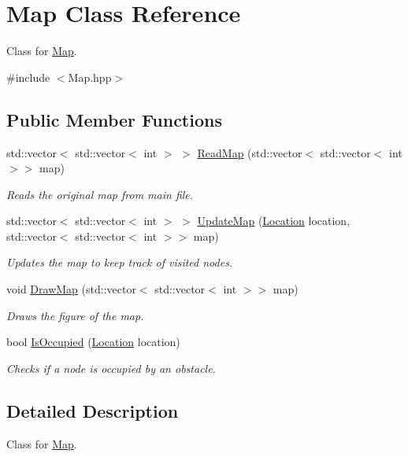 \hypertarget{classMap}{}\section{Map Class Reference}
\label{classMap}


Class for \hyperlink{classMap}{Map}.  




{\ttfamily \#include $<$Map.\+hpp$>$}

\subsection*{Public Member Functions}
\begin{DoxyCompactItemize}
\item 
std\+::vector$<$ std\+::vector$<$ int $>$ $>$ \hyperlink{classMap_a3e039af82e749384fc9f4c86e5d45a71}{Read\+Map} (std\+::vector$<$ std\+::vector$<$ int $>$$>$ map)
\begin{DoxyCompactList}\small\item\em Reads the original map from main file. \end{DoxyCompactList}\item 
std\+::vector$<$ std\+::vector$<$ int $>$ $>$ \hyperlink{classMap_a1f528c82fddfa3c592df6f0519a06297}{Update\+Map} (\hyperlink{structLocation}{Location} location, std\+::vector$<$ std\+::vector$<$ int $>$$>$ map)
\begin{DoxyCompactList}\small\item\em Updates the map to keep track of visited nodes. \end{DoxyCompactList}\item 
void \hyperlink{classMap_af62082268a739e6f49f64f12658889f6}{Draw\+Map} (std\+::vector$<$ std\+::vector$<$ int $>$$>$ map)
\begin{DoxyCompactList}\small\item\em Draws the figure of the map. \end{DoxyCompactList}\item 
bool \hyperlink{classMap_a45d7eb0b2246fb32ee8f1577cfbcb444}{Is\+Occupied} (\hyperlink{structLocation}{Location} location)
\begin{DoxyCompactList}\small\item\em Checks if a node is occupied by an obstacle. \end{DoxyCompactList}\end{DoxyCompactItemize}


\subsection{Detailed Description}
Class for \hyperlink{classMap}{Map}. 

